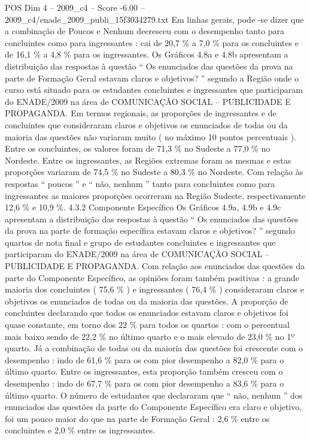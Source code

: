 \begin{textsample}{POS Dim 4 – 2009\_c4 – Score -6.00 – 2009\_c4/enade\_2009\_publi\_15f3034279.txt}
Em linhas gerais, pode -se dizer que a combinação de Poucos e Nenhum decresceu com o desempenho tanto para concluintes como para ingressantes : cai de 20,7 \% a 7,0 \% para os concluintes e de 16,1 \% a 4,8 \% para os ingressantes.
Os Gráficos 4.8a e 4.8b apresentam a distribuição das respostas à questão “ Os enunciados das questões da prova na parte de Formação Geral estavam claros e objetivos? ” segundo a Região onde o curso está situado para os estudantes concluintes e ingressantes que participaram do ENADE/2009 na área de COMUNICAÇÃO SOCIAL – PUBLICIDADE E PROPAGANDA.
Em termos regionais, as proporções de ingressantes e de concluintes que consideraram claros e objetivos os enunciados de todas ou da maioria das questões não variaram muito ( no máximo 10 pontos percentuais ).
Entre os concluintes, os valores foram de 71,3 \% no Sudeste a 77,0 \% no Nordeste.
Entre os ingressantes, as Regiões extremas foram as mesmas e estas proporções variaram de 74,5 \% no Sudeste a 80,3 \% no Nordeste.
Com relação às respostas “ poucos ” e “ não, nenhum ” tanto para concluintes como para ingressantes as maiores proporções ocorreram na Região Sudeste, respectivamente 12,6 \% e 10,9 \%. 4.3.2 Componente Específico Os Gráficos 4.9a, 4.9b e 4.9c apresentam a distribuição das respostas à questão “ Os enunciados das questões da prova na parte de formação específica estavam claros e objetivos? ” segundo quartos de nota final e grupo de estudantes concluintes e ingressantes que participaram do ENADE/2009 na área de COMUNICAÇÃO SOCIAL – PUBLICIDADE E PROPAGANDA.
Com relação aos enunciados das questões da parte do Componente Específico, as opiniões foram também positivas : a grande maioria dos concluintes ( 75,6 \% ) e ingressantes ( 76,4 \% ) consideraram claros e objetivos os enunciados de todas ou da maioria das questões.
A proporção de concluintes declarando que todos os enunciados estavam claros e objetivos foi quase constante, em torno dos 22 \% para todos os quartos : com o percentual mais baixo sendo de 22,2 \% no último quarto e o mais elevado de 23,0 \% no 1º quarto.
Já a combinação de todas ou da maioria das questões foi crescente com o desempenho : indo de 61,6 \% para os com pior desempenho a 82,0 \% para o último quarto.
Entre os ingressantes, esta proporção também cresceu com o desempenho : indo de 67,7 \% para os com pior desempenho a 83,6 \% para o último quarto.
O número de estudantes que declararam que “ não, nenhum ” dos enunciados das questões da parte do Componente Específico era claro e objetivo, foi um pouco maior do que na parte de Formação Geral : 2,6 \% entre os concluintes e 2,0 \% entre os ingressantes.

\end{textsample}
